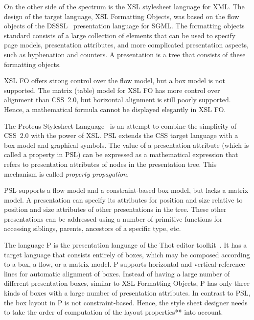  On the other side of the spectrum is the XSL stylesheet language for XML. The design of the target language, XSL Formatting Objects, was based on the flow objects of the DSSSL~\cite{dsssl96} presentation language for SGML. The formatting objects standard consists of a large collection of elements that can be used to specify page models, presentation attributes, and more complicated presentation aspects, such as hyphenation and counters. A presentation is a tree that consists of these formatting objects. 

XSL FO offers strong control over the flow model, but a box model is not supported. The matrix (table) model for XSL FO has more control over alignment than CSS~2.0, but horizontal alignment is still poorly supported. Hence, a mathematical formula cannot be displayed elegantly in XSL FO.


 The Proteus Stylesheet Language~\cite{marden98psl} is an attempt to combine the simplicity of CSS~2.0 with the power of XSL. PSL extends the CSS target language with a box model and graphical symbols. The value of a presentation attribute (which is called a property in PSL) can be expressed as a mathematical expression that refers to presentation attributes of nodes in the presentation tree. This mechanism is called {\em property propagation}. 

PSL supports a flow model and a constraint-based box model, but lacks a matrix model. A presentation can specify its attributes for position and size relative to position and size attributes of other presentations in the tree. These other presentations can be addressed using a number of primitive functions for accessing siblings, parents, ancestors of a specific type, etc.

 The  language P is the presentation language of the Thot editor toolkit~\cite{quint97thot}. It has a target language that consists entirely of boxes, which may be composed according to a box, a flow, or a matrix model. P supports horizontal and vertical-reference lines for automatic alignment of boxes. Instead of having a large number of different presentation boxes, similar to XSL Formatting Objects, P has only three kinds of boxes with a large number of presentation attributes. In contrast to PSL, the box layout in P is not constraint-based. \bc Hence, the style sheet designer needs to take the order of computation of the layout properties** into account. \ec 

